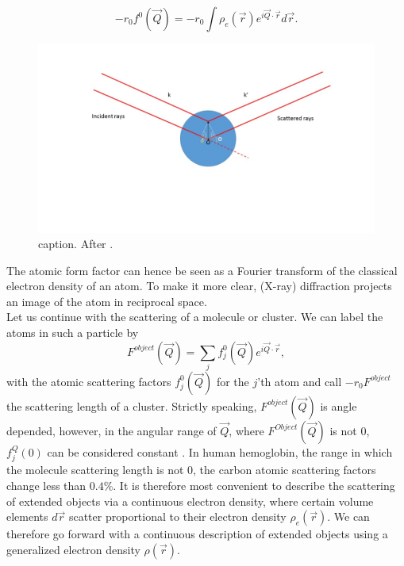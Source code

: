 \begin{equation}
-r_{0} f^{0}\left(\vec{Q}\right)=-r_{0}\int\rho_{e}\left(\vec{r}\right)e^{i \vec{Q}\cdot \vec{r}}d\vec{r}.
\label{eq:scattering-integral}
\end{equation}
\begin{figure}
	\centering
		\includegraphics[width=1.00\textwidth]{images/X-ray-scattering.jpg}
	\caption{caption. After \cite{Als-Nielson-2011-JWS,Guinier-1955-JWS}.}
	\label{fig:X-ray-scattering}
\end{figure}
The atomic form factor can hence be seen as a Fourier transform of the classical electron density of an atom. To make it more clear, (X-ray) diffraction projects an image of the atom in reciprocal space.\\
Let us continue with the scattering of a molecule or cluster. We can label the atoms in such a particle by
\begin{equation}
F^{object}\left(\vec{Q}\right)=\sum_{j}f_{j}^{0}\left(\vec{Q}\right)e^{i \vec{Q}\cdot \vec{r}},
\label{eq:scattering-factor-object}
\end{equation}
with the atomic scattering factors $f_{j}^{0}\left(\vec{Q}\right)$ for the $j$'th atom and call $-r_{0} F^{object}$ the scattering length of a cluster. Strictly speaking, $F^{object}\left(\vec{Q}\right)$ is angle depended, however, in the angular range of $\vec{Q}$, where $F^{Object}\left(\vec{Q}\right)$ is not 0, $f_{j}^{Q}\left(0\right)$ can be considered constant \citep[see][p. 6-7]{Guinier-1955-JWS}. In human hemoglobin, the range in which the molecule scattering length is not 0, the carbon atomic scattering factors change less than $0.4$\%. It is therefore most convenient to describe the scattering of extended objects via a continuous electron density, where certain volume elements $d\vec{r}$ scatter proportional to their electron density $\rho_{e}\left(\vec{r}\right)$. We can therefore go forward with a continuous description of extended objects using a generalized electron density $\rho\left(\vec{r}\right)$.\\
